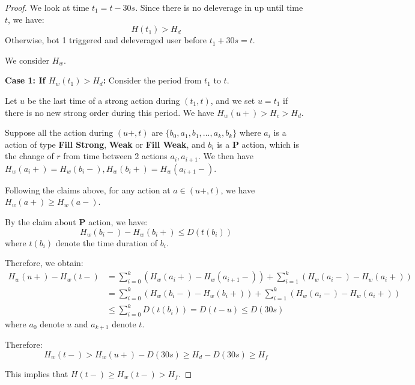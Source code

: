 \documentclass[notitlepage,reqno,11pt]{amsart}
\numberwithin{equation}{section}
\newcommand{\bt}{\beta}
\begin{document}
\begin{proof}
We look at time $t_1 = t-30s$. Since there is no deleverage in up until time $t$, we have: 
\begin{equation}\label{10.1}
    H(t_1) > H_d
\end{equation}
Otherwise, bot 1 triggered and deleveraged user before $t_1 + 30s = t$. 

We consider $H_w$. 

\textbf{Case 1: If $H_w(t_1) > H_d$:} Consider the period from $t_1$ to $t$. 

Let $u$ be the last time of a strong action during $(t_1, t)$, and we set $u=t_1$ if there is no new strong order during this period. We have $H_w(u+) > H_c > H_d$.

Suppose all the action during $(u+, t)$ are $\{b_0, a_1, b_1, ..., a_k, b_k\}$ where $a_i$ is a action of type \textbf{Fill Strong}, \textbf{Weak} or \textbf{Fill Weak}, and $b_i$ is a \textbf{P} action, which is the change of $r$ from time between 2 actions $a_i, a_{i+1}$. We then have $H_w(a_i+) = H_w(b_i-),H_w(b_i+) = H_w(a_{i+1}-)$.


Following the claims above, for any action at $a \in (u+, t)$, we have $H_w(a+) \geq H_w(a-)$.

By the claim about \textbf{P} action, we have: 
$$
H_w(b_i-) - H_w(b_i+) \leq D(t(b_i))
$$
where $t(b_i)$ denote the time duration of $b_i$.

Therefore, we obtain:
\begin{align}
H_w(u+) - H_w(t-) &= \sum_{i=0}^k \left(H_w(a_i+) - H_w(a_{i+1}-)\right) + \sum_{i=1}^k \left(H_w(a_i-) - H_w(a_i+)\right)\\
&= \sum_{i=0}^k \left(H_w(b_i-) - H_w(b_i+)\right) + \sum_{i=1}^k \left(H_w(a_i-) - H_w(a_i+)\right)\\
&\leq \sum_{i=0}^k D(t(b_i)) = D(t-u) \leq D(30s)
\end{align}
where $a_0$ denote $u$ and $a_{k+1}$ denote $t$.

Therefore:
$$H_w(t-) > H_w(u+) - D(30s) \geq H_d - D(30s) \geq H_f
$$

This implies that $H(t-)\geq H_w(t-) >H_f$.




\end{proof}
\end{document}
